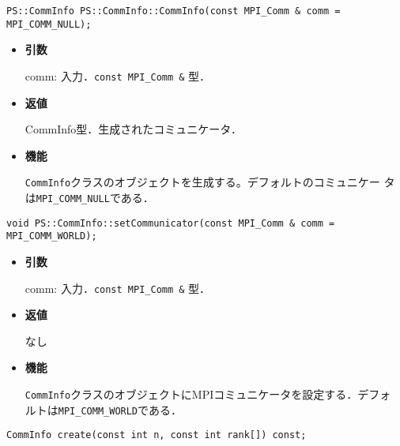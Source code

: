 

\begin{screen}
\begin{verbatim}
PS::CommInfo PS::CommInfo::CommInfo(const MPI_Comm & comm = MPI_COMM_NULL);
\end{verbatim}
\end{screen}

\begin{itemize}

\item {\bf 引数}

comm: 入力．{\tt const MPI\_Comm \&} 型．

\item {\bf 返値}

CommInfo型．生成されたコミュニケータ．

\item {\bf 機能}

{\tt CommInfo}クラスのオブジェクトを生成する。デフォルトのコミュニケー
タは{\tt MPI\_COMM\_NULL}である．

\end{itemize}

\begin{screen}
\begin{verbatim}
void PS::CommInfo::setCommunicator(const MPI_Comm & comm = MPI_COMM_WORLD);
\end{verbatim}
\end{screen}

\begin{itemize}

\item {\bf 引数}

comm: 入力．{\tt const MPI\_Comm \&} 型．

\item {\bf 返値}

なし

\item {\bf 機能}

{\tt CommInfo}クラスのオブジェクトにMPIコミュニケータを設定する．デフォ
ルトは{\tt MPI\_COMM\_WORLD}である．

\end{itemize}

\begin{screen}
\begin{verbatim}
CommInfo create(const int n, const int rank[]) const;
\end{verbatim}
\end{screen}

